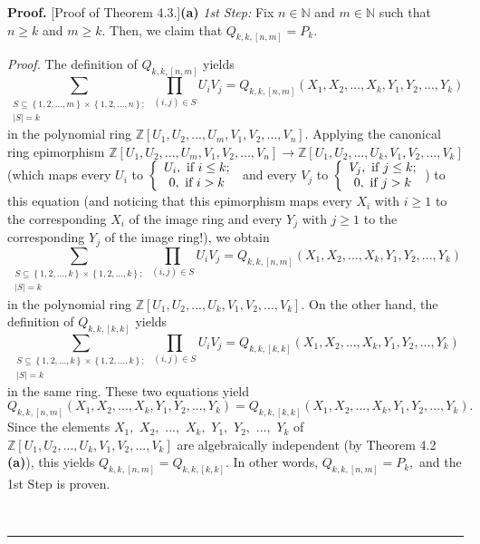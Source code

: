 \documentclass[numbers=enddot,12pt,final,onecolumn,notitlepage]{scrartcl}%
\newenvironment{proof}[1][Proof]{\noindent\textbf{#1.} }{\ \rule{0.5em}{0.5em}}
\begin{document}
\begin{proof}
[Proof of Theorem 4.3.]\textbf{(a)} \textit{1st Step:} Fix $n\in\mathbb{N}$
and $m\in\mathbb{N}$ such that $n\geq k$ and $m\geq k$. Then, we claim that
$Q_{k,k,\left[  n,m\right]  }=P_{k}$.

\textit{Proof.} The definition of $Q_{k,k,\left[  n,m\right]  }$ yields
\[
\sum_{\substack{S\subseteq\left\{  1,2,...,m\right\}  \times\left\{
1,2,...,n\right\}  ;\\\left\vert S\right\vert =k}}\prod_{\left(  i,j\right)
\in S}U_{i}V_{j}=Q_{k,k,\left[  n,m\right]  }\left(  X_{1},X_{2}%
,...,X_{k},Y_{1},Y_{2},...,Y_{k}\right)
\]
in the polynomial ring $\mathbb{Z}\left[  U_{1},U_{2},...,U_{m},V_{1}%
,V_{2},...,V_{n}\right]  $. Applying the canonical ring epimorphism
$\mathbb{Z}\left[  U_{1},U_{2},...,U_{m},V_{1},V_{2},...,V_{n}\right]
\rightarrow\mathbb{Z}\left[  U_{1},U_{2},...,U_{k},V_{1},V_{2},...,V_{k}%
\right]  $ (which maps every $U_{i}$ to $\left\{
\begin{array}
[c]{c}%
U_{i},\text{ if }i\leq k;\\
0,\text{ if }i>k
\end{array}
\right.  $ and every $V_{j}$ to $\left\{
\begin{array}
[c]{c}%
V_{j},\text{ if }j\leq k;\\
0,\text{ if }j>k
\end{array}
\right.  $) to this equation (and noticing that this epimorphism maps every
$X_{i}$ with $i\geq1$ to the corresponding $X_{i}$ of the image ring and every
$Y_{j}$ with $j\geq1$ to the corresponding $Y_{j}$ of the image ring!), we
obtain%
\[
\sum_{\substack{S\subseteq\left\{  1,2,...,k\right\}  \times\left\{
1,2,...,k\right\}  ;\\\left\vert S\right\vert =k}}\prod_{\left(  i,j\right)
\in S}U_{i}V_{j}=Q_{k,k,\left[  n,m\right]  }\left(  X_{1},X_{2}%
,...,X_{k},Y_{1},Y_{2},...,Y_{k}\right)
\]
in the polynomial ring $\mathbb{Z}\left[  U_{1},U_{2},...,U_{k},V_{1}%
,V_{2},...,V_{k}\right]  $. On the other hand, the definition of
$Q_{k,k,\left[  k,k\right]  }$ yields%
\[
\sum_{\substack{S\subseteq\left\{  1,2,...,k\right\}  \times\left\{
1,2,...,k\right\}  ;\\\left\vert S\right\vert =k}}\prod_{\left(  i,j\right)
\in S}U_{i}V_{j}=Q_{k,k,\left[  k,k\right]  }\left(  X_{1},X_{2}%
,...,X_{k},Y_{1},Y_{2},...,Y_{k}\right)
\]
in the same ring. These two equations yield%
\[
Q_{k,k,\left[  n,m\right]  }\left(  X_{1},X_{2},...,X_{k},Y_{1},Y_{2}%
,...,Y_{k}\right)  =Q_{k,k,\left[  k,k\right]  }\left(  X_{1},X_{2}%
,...,X_{k},Y_{1},Y_{2},...,Y_{k}\right)  .
\]
Since the elements $X_{1},$ $X_{2},$ $...,$ $X_{k},$ $Y_{1},$ $Y_{2},$ $...,$
$Y_{k}$ of $\mathbb{Z}\left[  U_{1},U_{2},...,U_{k},V_{1},V_{2},...,V_{k}%
\right]  $ are algebraically independent (by Theorem 4.2 \textbf{(a)}), this
yields $Q_{k,k,\left[  n,m\right]  }=Q_{k,k,\left[  k,k\right]  }.$ In other
words, $Q_{k,k,\left[  n,m\right]  }=P_{k},$ and the 1st Step is proven.


\end{proof}
\end{document}
